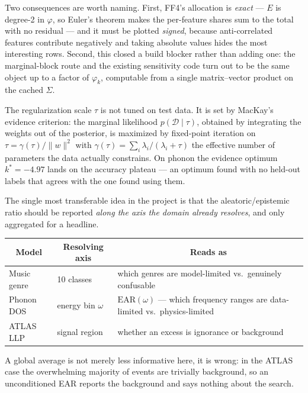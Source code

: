 \documentclass[11pt]{article}
\newcommand{\hL}[1]{\multicolumn{1}{|c|}{\textbf{#1}}}
\newcommand{\hC}[1]{\multicolumn{1}{c|}{\textbf{#1}}}
\begin{document}
Two consequences are worth naming. First, FF4's allocation is \emph{exact} ---
$E$ is degree-2 in $\varphi$, so Euler's theorem makes the per-feature shares
sum to the total with no residual --- and it must be plotted \emph{signed},
because anti-correlated features contribute negatively and taking absolute
values hides the most interesting rows. Second, this closed a build blocker
rather than adding one: the marginal-block route and the existing
sensitivity code turn out to be the same object up to a factor of
$\varphi_k$, computable from a single matrix--vector product on the cached
$\Sigma$.

The regularization scale $\tau$ is not tuned on test data. It is set by MacKay's
evidence criterion: the marginal likelihood $p(\mathcal{D}\mid\tau)$, obtained by
integrating the weights out of the posterior, is maximized by fixed-point
iteration on $\tau=\gamma(\tau)/\lVert w\rVert^2$ with
$\gamma(\tau)=\sum_i\lambda_i/(\lambda_i+\tau)$ the effective number of
parameters the data actually constrains. On phonon the evidence optimum
$k^*=-4.97$ lands on the accuracy plateau --- an optimum found with no held-out
labels that agrees with the one found using them.


The single most transferable idea in the project is that the
aleatoric/epistemic ratio should be reported \emph{along the axis the domain
already resolves}, and only aggregated for a headline.

\begin{center}\boardfont
\begin{tabularx}{\linewidth}{|l|l|Y|}
\hline
\hL{Model} & \hC{Resolving axis} & \hC{Reads as} \\ \hline
Music genre & 10 classes & which genres are model-limited vs.\ genuinely confusable \\ \hline
Phonon DOS & energy bin $\omega$ & $\mathrm{EAR}(\omega)$ --- which frequency ranges are data-limited vs.\ physics-limited \\ \hline
ATLAS LLP & signal region & whether an excess is ignorance or background \\ \hline
\end{tabularx}
\end{center}

A global average is not merely less informative here, it is wrong: in the
ATLAS case the overwhelming majority of events are trivially background, so an
unconditioned EAR reports the background and says nothing about the search.
\end{document}

